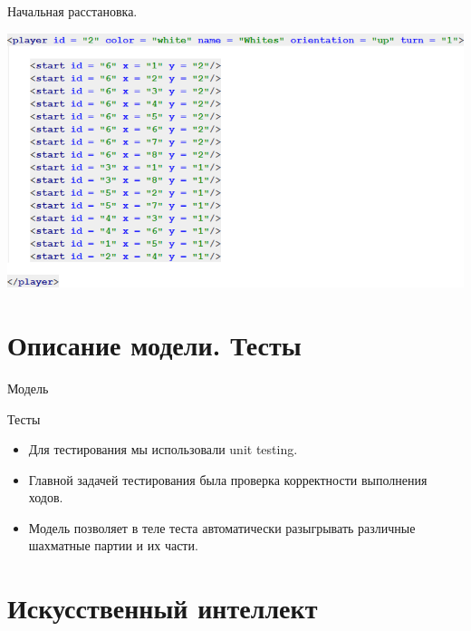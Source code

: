 \documentclass[11pt,slides,aspectratio=43]{beamer}
\begin{document}
	\begin{frame}{Начальная расстановка.}
		\begin{block}{}
            \begin{center}
			     \includegraphics[scale=0.5]{gameBoard.png}
		    \end{center}
		\end{block}
	\end{frame}

    \section{Описание модели. Тесты}

     \begin{frame}{Модель}
	
	\end{frame}

    \begin{frame}{Тесты}
		\begin{itemize}
	           \item Для тестирования мы использовали unit testing.
               \item Главной задачей тестирования была проверка корректности выполнения ходов.
               \item Модель позволяет в теле теста автоматически разыгрывать различные шахматные партии и их части.
        \end{itemize}
	\end{frame}

    \section{Искусственный интеллект}
\end{document}
